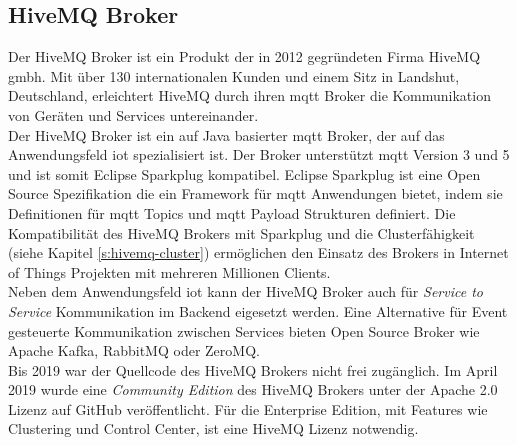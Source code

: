 \newpage

\subsection{HiveMQ Broker} \label{s:hivemq-broker}
Der HiveMQ Broker ist ein Produkt der in 2012 gegründeten Firma HiveMQ \acs{gmbh}. Mit über 130 internationalen Kunden und einem Sitz in Landshut, Deutschland, erleichtert HiveMQ durch ihren \ac{mqtt} Broker die Kommunikation von Geräten und Services untereinander.
\cite{HiveMQCompanya}
\\
Der HiveMQ Broker ist ein auf Java basierter \ac{mqtt} Broker, der auf das Anwendungsfeld \acl{iot} spezialisiert ist. Der Broker unterstützt \ac{mqtt} Version 3 und 5 und ist somit Eclipse Sparkplug kompatibel.
Eclipse Sparkplug ist eine Open Source Spezifikation die ein Framework für \ac{mqtt} Anwendungen bietet, indem sie Definitionen für \ac{mqtt} Topics und \ac{mqtt} Payload Strukturen definiert.
Die Kompatibilität des HiveMQ Brokers mit Sparkplug und die Clusterfähigkeit (siehe Kapitel \ref{s:hivemq-cluster}) ermöglichen den Einsatz des Brokers in Internet of Things Projekten mit mehreren Millionen Clients.
\cite{obermaierMQTTSparkplugEssentials}
\\
Neben dem Anwendungsfeld \ac{iot} kann der HiveMQ Broker auch für \textit{Service to Service} Kommunikation im Backend eigesetzt werden.
Eine Alternative für Event gesteuerte Kommunikation zwischen Services bieten Open Source Broker wie Apache Kafka, RabbitMQ oder ZeroMQ.
\\
Bis 2019 war der Quellcode des HiveMQ Brokers nicht frei zugänglich. Im April 2019 wurde eine \textit{Community Edition} des HiveMQ Brokers unter der Apache 2.0 Lizenz auf GitHub veröffentlicht. Für die Enterprise Edition, mit Features wie Clustering und Control Center, ist eine HiveMQ Lizenz notwendig.

